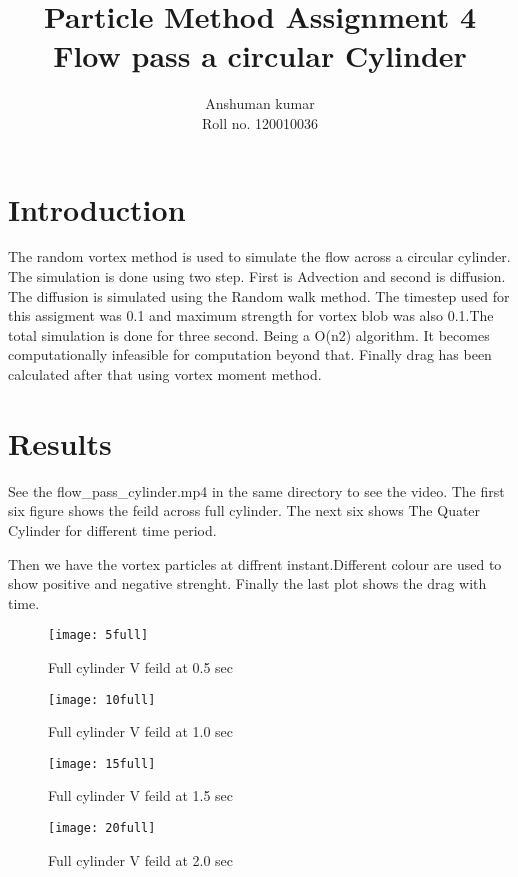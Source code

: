 \documentclass[12pt]{article}
\title {Particle Method Assignment 4 \\
Flow pass a circular Cylinder}
\author {Anshuman kumar \\
Roll no.  120010036}
\begin{document}
\maketitle

\section{Introduction}
The random vortex method is used to simulate the flow across a circular cylinder. 
The simulation is done using two step. First is Advection and second is diffusion.
The diffusion is simulated using the Random walk method. The timestep used
for this assigment was 0.1 and maximum strength for vortex blob was also 
0.1.The total simulation is done for three second. Being a O(n2) algorithm.
It becomes computationally infeasible for computation beyond that. Finally drag has been calculated after that using vortex moment method.

\section{Results}
See the flow\_pass\_cylinder.mp4 in the same directory to see the video.
The first six figure shows the feild across full cylinder. The next six shows
The Quater Cylinder for different time period.

Then we have the vortex particles 
at diffrent instant.Different colour are used to show positive and negative strenght. Finally the last plot shows the drag with time.
\begin{figure}
\centering
\begin{minipage}{.5\textwidth}
  \centering
  \texttt{[image: 5full]}
  \captionsetup{width=0.8\textwidth}
  \caption{Full cylinder V feild at 0.5 sec} 
\end{minipage}%
\begin{minipage}{.5\textwidth}
  \centering
  \texttt{[image: 10full]}
  \captionsetup{width=0.8\textwidth}
  \caption{Full cylinder V feild at 1.0 sec} 
\end{minipage}
\end{figure}

\begin{figure}
\centering
\begin{minipage}{.5\textwidth}
  \centering
  \texttt{[image: 15full]}
  \captionsetup{width=0.8\textwidth}
  \caption{Full cylinder V feild at 1.5 sec} 
\end{minipage}%
\begin{minipage}{.5\textwidth}
  \centering
  \texttt{[image: 20full]}
  \captionsetup{width=0.8\textwidth}
  \caption{Full cylinder V feild at 2.0 sec} 
\end{minipage}
\end{figure}
\end{document}
